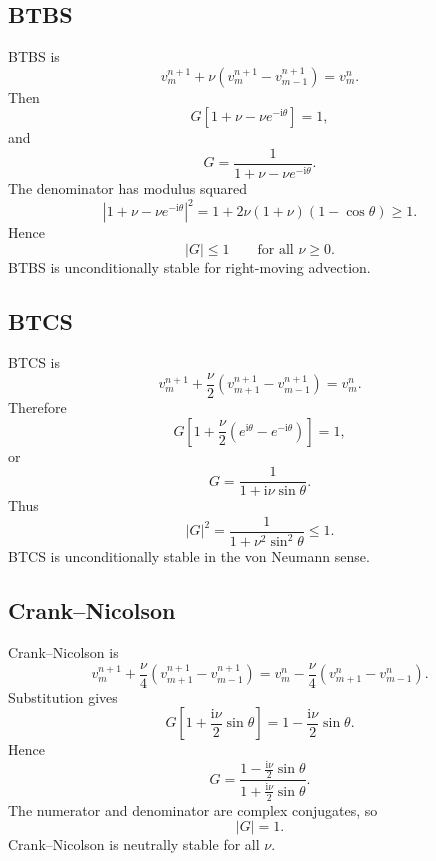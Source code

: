 \documentclass[11pt]{article}
\newcommand{\ii}{\mathrm{i}}
\begin{document}
\subsection{BTBS}

BTBS is
\begin{equation}
    v_m^{n+1}
    +\nu(v_m^{n+1}-v_{m-1}^{n+1})=v_m^n.
\end{equation}
Then
\begin{equation}
    G\left[1+\nu-\nu e^{-\ii\theta}\right]=1,
\end{equation}
and
\begin{equation}
    G=\frac{1}{1+\nu-\nu e^{-\ii\theta}}.
\end{equation}
The denominator has modulus squared
\begin{equation}
    |1+\nu-\nu e^{-\ii\theta}|^2
    =
    1+2\nu(1+\nu)(1-\cos\theta)\ge1.
\end{equation}
Hence
\begin{equation}
    |G|\le1
    \qquad\text{for all }\nu\ge0.
\end{equation}
BTBS is unconditionally stable for right-moving advection.

\subsection{BTCS}

BTCS is
\begin{equation}
    v_m^{n+1}
    +\frac{\nu}{2}(v_{m+1}^{n+1}-v_{m-1}^{n+1})=v_m^n.
\end{equation}
Therefore
\begin{equation}
    G\left[1+\frac{\nu}{2}(e^{\ii\theta}-e^{-\ii\theta})\right]=1,
\end{equation}
or
\begin{equation}
    G=\frac{1}{1+\ii\nu\sin\theta}.
\end{equation}
Thus
\begin{equation}
    |G|^2=\frac{1}{1+\nu^2\sin^2\theta}\le1.
\end{equation}
BTCS is unconditionally stable in the von Neumann sense.

\subsection{Crank--Nicolson}

Crank--Nicolson is
\begin{equation}
    v_m^{n+1}
    +\frac{\nu}{4}(v_{m+1}^{n+1}-v_{m-1}^{n+1})
    =
    v_m^n
    -\frac{\nu}{4}(v_{m+1}^{n}-v_{m-1}^{n}).
\end{equation}
Substitution gives
\begin{equation}
    G\left[1+\frac{\ii\nu}{2}\sin\theta\right]
    =
    1-\frac{\ii\nu}{2}\sin\theta.
\end{equation}
Hence
\begin{equation}
    G=
    \frac{1-\frac{\ii\nu}{2}\sin\theta}
         {1+\frac{\ii\nu}{2}\sin\theta}.
\end{equation}
The numerator and denominator are complex conjugates, so
\begin{equation}
    |G|=1.
\end{equation}
Crank--Nicolson is neutrally stable for all $\nu$.
\end{document}
